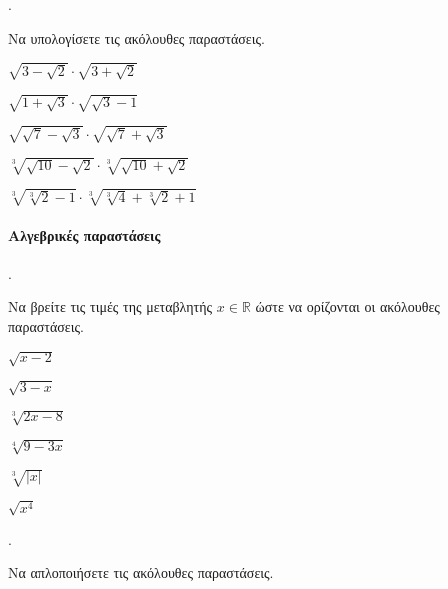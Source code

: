 \documentclass[11pt,a4paper,twocolumn]{article}
\newcounter{askhsh}
\newcommand{\askhsh}{\large\theaskhsh.\ \addtocounter{askhsh}{1}}
\begin{document}
\askhsh Να υπολογίσετε τις ακόλουθες παραστάσεις.
\begin{alist}
\item $\sqrt{3-\sqrt{2}}\cdot\sqrt{3+\sqrt{2}}$
\item $\sqrt{1+\sqrt{3}}\cdot\sqrt{\sqrt{3}-1}$
\item $\sqrt{\sqrt{7}-\sqrt{3}}\cdot\sqrt{\sqrt{7}+\sqrt{3}}$
\item $\sqrt[3]{\sqrt{10}-\sqrt{2}}\cdot\sqrt[3]{\sqrt{10}+\sqrt{2}}$
\item $\sqrt[3]{\sqrt[3]{2}-1}\cdot\sqrt[3]{\sqrt[3]{4}+\sqrt[3]{2}+1}$
\end{alist}
\paragraph{Αλγεβρικές παραστάσεις}
\askhsh Να βρείτε τις τιμές της μεταβλητής $x\in\mathbb{R}$ ώστε να ορίζονται οι ακόλουθες παραστάσεις.
\begin{multicols}{2}
\begin{alist}
\item $\sqrt{x-2}$
\item $\sqrt{3-x}$
\item $\sqrt[3]{2x-8}$
\item $\sqrt[4]{9-3x}$
\item $\sqrt[3]{|x|}$
\item $\sqrt{x^4}$
\end{alist}
\end{multicols}
\askhsh Να απλοποιήσετε τις ακόλουθες παραστάσεις.
\begin{alist}
\item 
\end{alist}
\end{document}
